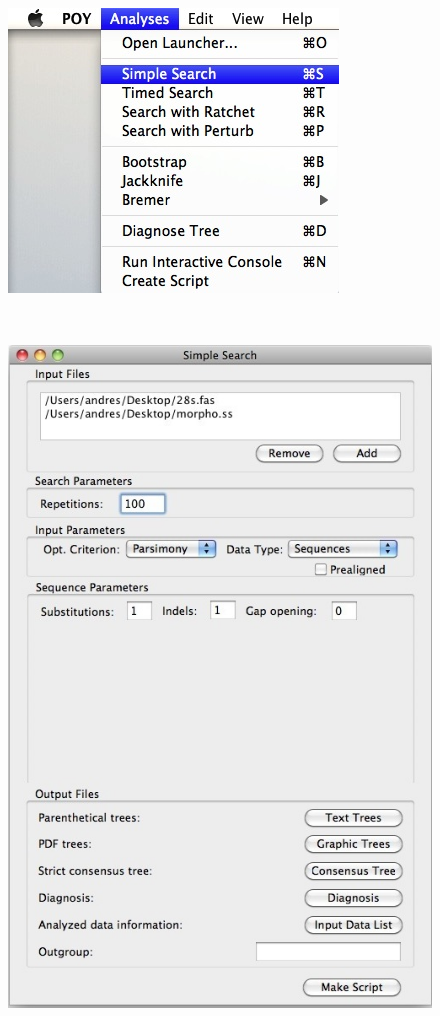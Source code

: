 \begin{figure}
\centering
\begin{minipage}[c]{0.45\textwidth}
   		\includegraphics[width=\textwidth]{doc/figures/simplesearch_menu.jpg}
\end{minipage}
\,
\begin{minipage}[c]{0.52\textwidth}
	   	\includegraphics[width=\textwidth]{doc/figures/simplesearch_window_filled.jpg}

\end{minipage}
\end{figure}
